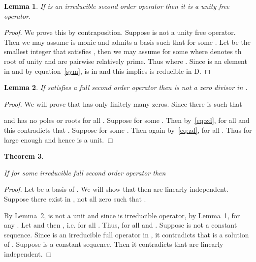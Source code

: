 \documentclass{article}
\newtheorem{theorem}{Theorem}[section]
\newtheorem{lemma}[theorem]{Lemma}
\begin{document}
\begin{lemma}
\label{lm:unfr}
If  is an irreducible second order operator then it is a unity free operator.
\end{lemma}

\begin{proof}

  We prove this by contraposition.  Suppose  is not a unity free operator.
  Then we may assume  is monic and  admits a basis  such that
   for some .  Let  be the smallest integer that
  satisfies , then we may assume  for some  where  denotes th root of unity
  and  are pairwise relatively prime.  Thus
   where
  . Since  is an element in  and by equation~\eqref{sym},  is in
   and this implies  is reducible in D.
\end{proof}

\begin{lemma}
\label{lm:zd}
If  satisfies a full second order operator  then 
 is not a zero divisor in .
\end{lemma}

\begin{proof}
We will prove that  has only finitely many zeros.
Since  there is  such that 

and  has no poles or roots for all . Suppose 
for some . Then by~\eqref{eq:zd},  for all  and this
contradicts that . Suppose  for some .
Then again by~\eqref{eq:zd},  for all . Thus  for
 large enough and hence  is a unit.
\end{proof}

\begin{theorem}\label{thm:nonvan}

  If  for some irreducible full second order operator  then 

\end{theorem}
\begin{proof} 

   Let  be a basis of . We will show that then  are linearly independent.  Suppose there exist  in , not all zero
  such that .  
  
  By Lemma~\ref{lm:zd},  is not a unit and since  is irreducible operator, by
  Lemma~\ref{lm:unfr},  for any .  Let  and  then , i.e.  for
  all .  Thus,  for all  and
  . Suppose  is not a constant sequence. Since  is an irreducible full operator
  in , it contradicts that  is a solution of .  Suppose  is a constant
  sequence. Then it contradicts that  are  linearly independent.
\end{proof}
\end{document}
